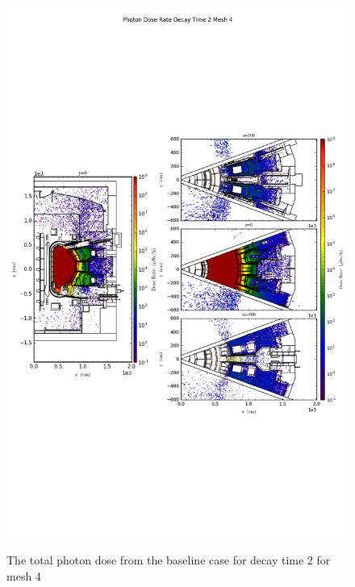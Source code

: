\begin{figure}[ht!]
\centering
\includegraphics[trim={0cm 9cm 0cm 10cm},clip,scale=0.75]{../plots/final_model_nob4c/Photon_Dose_Rate_Decay_Time_2_Mesh_4.png}
\label{fig:photons_dc2_no4bc_m4_flux}
\caption{The total photon dose from the baseline case for decay time 2 for mesh 4}
\end{figure}
